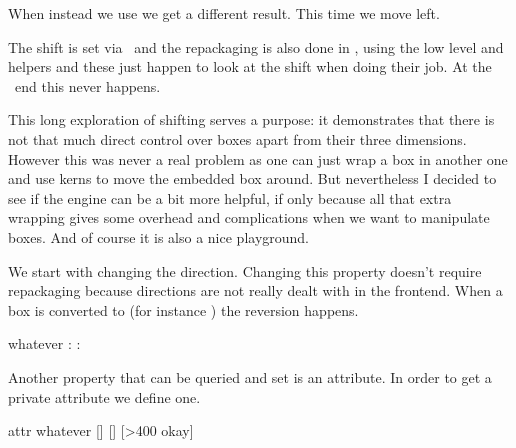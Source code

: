 \startlinecorrection
\getbuffer[demo]\getbuffer
\stoplinecorrection

When instead we use \type {\vpackbox} we get a different result. This time we
move left.

\startbuffer
\hbox\bgroup
    \showstruts \strut
    \quad                            \copy\scratchbox
    \quad \shiftbox\scratchbox -10mm \copy\scratchbox
    \quad \vpackbox\scratchbox       \copy\scratchbox
    \quad \strut
\egroup
\stopbuffer

\typebuffer[option=TEX]

\startlinecorrection
\getbuffer[demo]\getbuffer
\stoplinecorrection

The shift is set via \LUA\ and the repackaging is also done in \LUA, using the
low level  and  helpers and these just happen to look
at the shift when doing their job. At the \TEX\ end this never happens.

This long exploration of shifting serves a purpose: it demonstrates that there is
not that much direct control over boxes apart from their three dimensions.
However this was never a real problem as one can just wrap a box in another one
and use kerns to move the embedded box around. But nevertheless I decided to see
if the engine can be a bit more helpful, if only because all that extra wrapping
gives some overhead and complications when we want to manipulate boxes. And of
course it is also a nice playground.

We start with changing the direction. Changing this property doesn't require
repackaging because directions are not really dealt with in the frontend. When
a box is converted to (for instance \PDF) the reversion happens.

\startbuffer
\setbox\scratchbox\hbox{whatever}
\the\boxdirection\scratchbox: \copy\scratchbox \crlf
\boxdirection{}
\the\boxdirection\scratchbox: \copy\scratchbox
\stopbuffer

\typebuffer[option=TEX]

\startlinecorrection
\getbuffer
\stoplinecorrection

Another property that can be queried and set is an attribute. In order to get
a private attribute we define one.

\startbuffer
\newattribute\MyAt
\setbox\scratchbox\hbox attr  {whatever}
[\the\boxattr\scratchbox\MyAt]
\boxattr\scratchbox{}
[\the\boxattr\scratchbox\MyAt]
[\ifnum\boxattr\scratchbox\MyAt>400 okay\fi]
\stopbuffer

